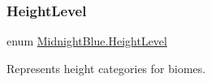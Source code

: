 \hypertarget{namespace_midnight_blue_a86f8aaa0bbb651a6a094d3eb95f799e0}{}\label{namespace_midnight_blue_a86f8aaa0bbb651a6a094d3eb95f799e0} 
\subsubsection{\texorpdfstring{Height\+Level}{HeightLevel}}
{\footnotesize\ttfamily enum \hyperlink{namespace_midnight_blue_a86f8aaa0bbb651a6a094d3eb95f799e0}{Midnight\+Blue.\+Height\+Level}\hspace{0.3cm}{\ttfamily [strong]}}



Represents height categories for biomes. 

